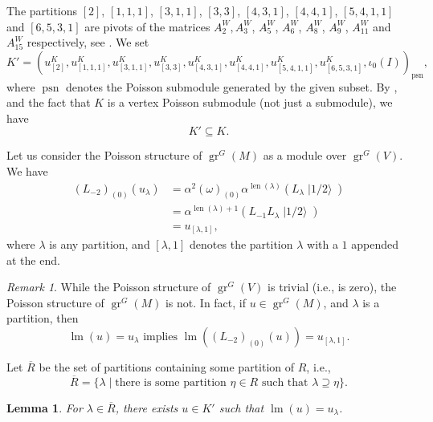 \documentclass[a4paper, 12pt, reqno]{amsart}
\newtheorem{lemma}[theorem]{Lemma}
\theoremstyle{remark}
\newtheorem{remark}[theorem]{Remark}
\DeclareMathOperator{\gr}{gr}
\DeclareMathOperator{\lm}{lm}
\DeclareMathOperator{\len}{len}
\DeclareMathOperator{\psn}{psn}
\DeclareMathOperator{\vachalf}{|1/2\rangle}
\begin{document}
The partitions $[2]$, $[1, 1, 1]$, $[3, 1, 1]$, $[3, 3]$, $[4, 3, 1]$, $[4, 4, 1]$, $[5, 4, 1, 1]$ and $[6, 5, 3, 1]$ are pivots of the matrices $A^W_2, A^W_3$, $A^W_5$, $A^W_6$, $A^W_8$, $A^W_9$, $A^W_{11}$ and $A^W_{15}$ respectively, see \cite[ising-modules.ipynb]{sagemath2}.
We set
\begin{equation*}
  K' = (u^K_{[2]}, u^K_{[1, 1, 1]}, u^K_{[3, 1, 1]}, u^K_{[3, 3]}, u^K_{[4, 3, 1]}, u^K_{[4, 4, 1]}, u^K_{[5, 4, 1, 1]}, u^K_{[6, 5, 3, 1]}, \iota_0(I))_{\psn},
\end{equation*}
where $\psn$ denotes the Poisson submodule generated by the given subset.
By ,  and the fact that $K$ is a vertex Poisson submodule (not just a submodule), we have
\begin{equation*}
  K' \subseteq K.
\end{equation*}

Let us consider the Poisson structure of $\gr^G(M)$ as a module over $\gr^G(V)$.
We have
\begin{align*}
  (L_{-2})_{(0)}(u_{\lambda}) &= \alpha^2(\omega)_{(0)}\alpha^{\len(\lambda)}(L_{\lambda}\vachalf) \\
                              &= \alpha^{\len(\lambda) + 1}(L_{-1}L_{\lambda}\vachalf) \\
                              &= u_{[\lambda, 1]},
\end{align*}
where $\lambda$ is any partition, and $[\lambda, 1]$ denotes the partition $\lambda$ with a $1$ appended at the end.

\begin{remark}
  \label{rmk:5}
  While the Poisson structure of $\gr^G(V)$ is trivial (i.e., is zero), the Poisson structure of $\gr^G(M)$ is not.
  In fact, if $u \in \gr^G(M)$, and $\lambda$ is a partition, then
  \begin{equation*}
    \lm(u) = u_{\lambda}\text{ implies }\lm((L_{-2})_{(0)}(u)) = u_{[\lambda, 1]}.
  \end{equation*}
\end{remark}

Let $\overline{R}$ be the set of partitions containing some partition of $R$, i.e.,
\begin{equation*}
  \overline{R} = \{\lambda \mid \text{there is some partition $\eta \in R$ such that $\lambda \supseteq \eta$}\}.
\end{equation*}

\begin{lemma}
  \label{lmm:10}
  For $\lambda \in \overline{R}$, there exists $u \in K'$ such that $\lm(u) = u_{\lambda}$.
\end{lemma}
\end{document}
